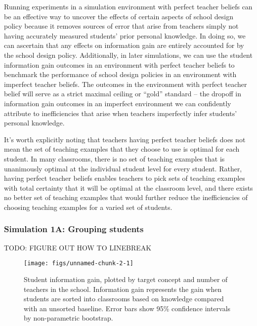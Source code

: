\documentclass[10pt, letterpaper]{article}
\newenvironment{CodeChunk}{}{}
\begin{document}
Running experiments in a simulation environment with perfect teacher
beliefs can be an effective way to uncover the effects of certain
aspects of school design policy because it removes sources of error that
arise from teachers simply not having accurately measured students'
prior personal knowledge. In doing so, we can ascertain that any effects
on information gain are entirely accounted for by the school design
policy. Additionally, in later simulations, we can use the student
information gain outcomes in an environment with perfect teacher beliefs
to benchmark the performance of school design policies in an environment
with imperfect teacher beliefs. The outcomes in the environment with
perfect teacher belief will serve as a strict maximal ceiling or
``gold'' standard -- the dropoff in information gain outcomes in an
imperfect environment we can confidently attribute to inefficiencies
that arise when teachers imperfectly infer students' personal knowledge.

It's worth explicitly noting that teachers having perfect teacher
beliefs does not mean the set of teaching examples that they choose to
use is optimal for each student. In many classrooms, there is no set of
teaching examples that is unanimously optimal at the individual student
level for every student. Rather, having perfect teacher beliefs enables
teachers to pick sets of teaching examples with total certainty that it
will be optimal at the classroom level, and there exists no better set
of teaching examples that would further reduce the inefficiencies of
choosing teaching examples for a varied set of students.

\subsubsection{Simulation 1A: Grouping
students}\label{simulation-1a-grouping-students}

TODO: FIGURE OUT HOW TO LINEBREAK

\begin{CodeChunk}
\begin{figure}[t]
\texttt{[image: figs/unnamed-chunk-2-1]} \caption[Student information gain, plotted by target concept and number of teachers in the school]{Student information gain, plotted by target concept and number of teachers in the school. Information gain represents the gain when students are sorted into classrooms based on knowledge compared with an unsorted baseline. Error bars show 95\% confidence intervals by non-parametric bootstrap.}\label{fig:unnamed-chunk-2}
\end{figure}
\end{CodeChunk}
\end{document}
